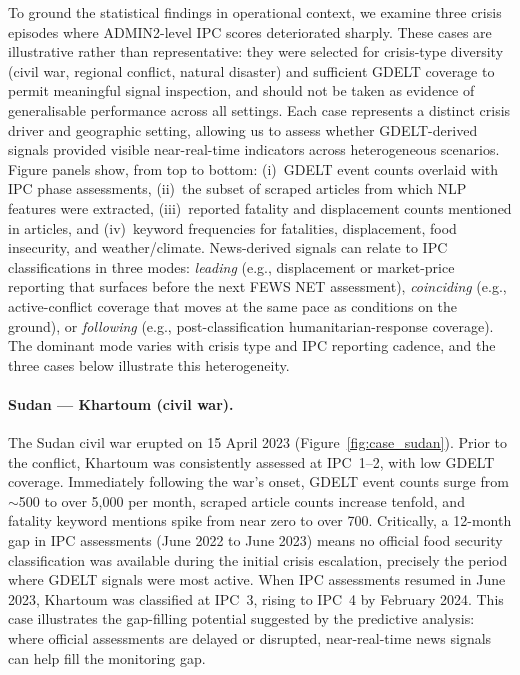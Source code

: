 \documentclass{article}
\begin{document}
To ground the statistical findings in operational context, we examine three crisis episodes where ADMIN2-level IPC scores deteriorated sharply. These cases are illustrative rather than representative: they were selected for crisis-type diversity (civil war, regional conflict, natural disaster) and sufficient GDELT coverage to permit meaningful signal inspection, and should not be taken as evidence of generalisable performance across all settings. Each case represents a distinct crisis driver and geographic setting, allowing us to assess whether GDELT-derived signals provided visible near-real-time indicators across heterogeneous scenarios. Figure panels show, from top to bottom: (i)~GDELT event counts overlaid with IPC phase assessments, (ii)~the subset of scraped articles from which NLP features were extracted, (iii)~reported fatality and displacement counts mentioned in articles, and (iv)~keyword frequencies for fatalities, displacement, food insecurity, and weather/climate. News-derived signals can relate to IPC classifications in three modes: \emph{leading} (e.g., displacement or market-price reporting that surfaces before the next FEWS NET assessment), \emph{coinciding} (e.g., active-conflict coverage that moves at the same pace as conditions on the ground), or \emph{following} (e.g., post-classification humanitarian-response coverage). The dominant mode varies with crisis type and IPC reporting cadence, and the three cases below illustrate this heterogeneity.

\paragraph{Sudan --- Khartoum (civil war).}
The Sudan civil war erupted on 15 April 2023 (Figure~\ref{fig:case_sudan}). Prior to the conflict, Khartoum was consistently assessed at IPC~1--2, with low GDELT coverage. Immediately following the war's onset, GDELT event counts surge from $\sim$500 to over 5{,}000 per month, scraped article counts increase tenfold, and fatality keyword mentions spike from near zero to over 700. Critically, a 12-month gap in IPC assessments (June 2022 to June 2023) means no official food security classification was available during the initial crisis escalation, precisely the period where GDELT signals were most active. When IPC assessments resumed in June 2023, Khartoum was classified at IPC~3, rising to IPC~4 by February 2024. This case illustrates the gap-filling potential suggested by the predictive analysis: where official assessments are delayed or disrupted, near-real-time news signals can help fill the monitoring gap.
\end{document}
